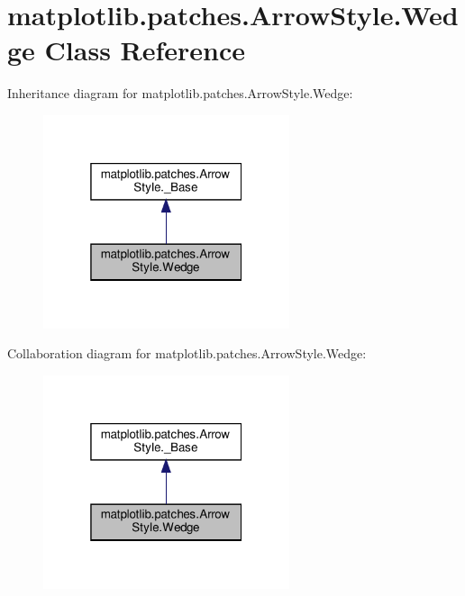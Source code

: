 \hypertarget{classmatplotlib_1_1patches_1_1ArrowStyle_1_1Wedge}{}\section{matplotlib.\+patches.\+Arrow\+Style.\+Wedge Class Reference}
\label{classmatplotlib_1_1patches_1_1ArrowStyle_1_1Wedge}


Inheritance diagram for matplotlib.\+patches.\+Arrow\+Style.\+Wedge\+:
\nopagebreak
\begin{figure}[H]
\begin{center}
\leavevmode
\includegraphics[width=205pt]{classmatplotlib_1_1patches_1_1ArrowStyle_1_1Wedge__inherit__graph}
\end{center}
\end{figure}


Collaboration diagram for matplotlib.\+patches.\+Arrow\+Style.\+Wedge\+:
\nopagebreak
\begin{figure}[H]
\begin{center}
\leavevmode
\includegraphics[width=205pt]{classmatplotlib_1_1patches_1_1ArrowStyle_1_1Wedge__coll__graph}
\end{center}
\end{figure}
